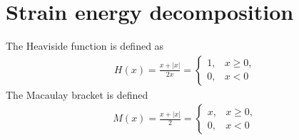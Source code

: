 \documentclass[12pt,3p]{article}
\numberwithin{equation}{section}
\begin{document}
\section{Strain energy decomposition}
The Heaviside function is defined as 
\begin{align*}
H(x) = \frac{x + |x|}{2 x} =
\begin{cases}
	1, & x \geq 0, \\
	0, & x < 0	
\end{cases}
\end{align*}
The Macaulay bracket is defined
\begin{align*}
M(x) = \frac{x + |x|}{2} =
\begin{cases}
	x, & x \geq 0, \\
	0, & x < 0	
\end{cases}
\end{align*}

\end{document}
